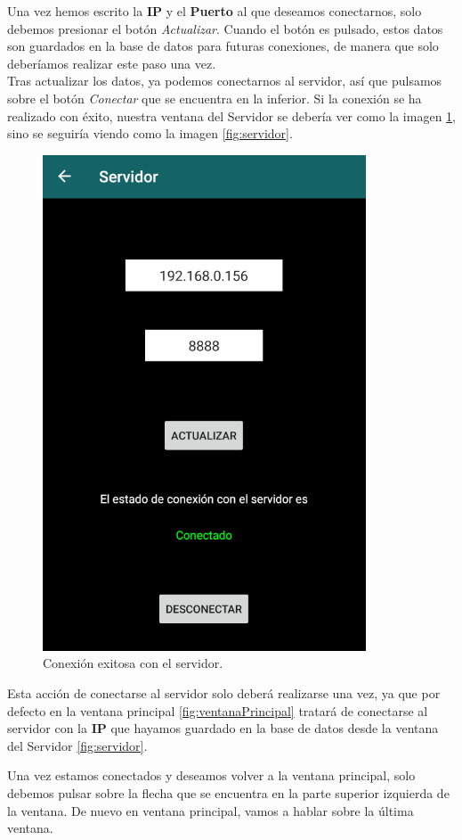Una vez hemos escrito la \textbf{IP} y el \textbf{Puerto} al que deseamos conectarnos, solo debemos presionar el botón \textit{Actualizar}. Cuando el botón es pulsado, estos datos son guardados en la base de datos para futuras conexiones, de manera que solo deberíamos realizar este paso una vez. \\
Tras actualizar los datos, ya podemos conectarnos al servidor, así que pulsamos sobre el botón \textit{Conectar} que se encuentra en la inferior. Si la conexión se ha realizado con éxito, nuestra ventana del Servidor se debería ver como la imagen \ref{fig:conectado}, sino se seguiría viendo como la imagen \ref{fig:servidor}.

\begin{figure}[h!]
	\centering
	\includegraphics[width=0.6\linewidth]{img/conectado}
	\caption{Conexión exitosa con el servidor.}
	\label{fig:conectado}
\end{figure}

Esta acción de conectarse al servidor solo deberá realizarse una vez, ya que por defecto en la ventana principal \ref{fig:ventanaPrincipal} tratará de conectarse al servidor con la \textbf{IP} que hayamos guardado en la base de datos desde la ventana del Servidor \ref{fig:servidor}.

Una vez estamos conectados y deseamos volver a la ventana principal, solo debemos pulsar sobre la flecha que se encuentra en la parte superior izquierda de la ventana. De nuevo en ventana principal, vamos a hablar sobre la última ventana.

